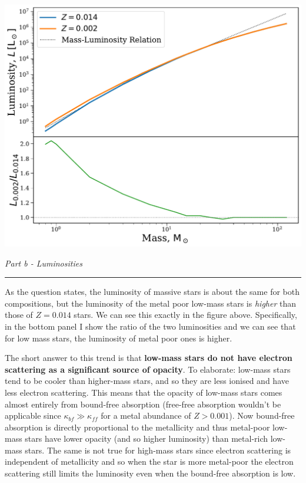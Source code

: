 \documentclass[12pt, letterpaper, twoside]{article}
\newcommand{\question}[1]{{\noindent \it #1}}
\newcommand{\answer}[1]{
    \par\noindent\rule{\textwidth}{0.4pt}#1\vspace{0.5cm}
}
\begin{document}
\begin{center}
    \includegraphics[width=\textwidth]{figures/ml_relation.pdf}
\end{center}   

\question{Part b - Luminosities}
\answer{
    As the question states, the luminosity of massive stars is about the same for both compositions, but the luminosity of the metal poor low-mass stars is \textit{higher} than those of $Z = 0.014$ stars. We can see this exactly in the figure above. Specifically, in the bottom panel I show the ratio of the two luminosities and we can see that for low mass stars, the luminosity of metal poor ones is higher.

    The short answer to this trend is that \textbf{low-mass stars do not have electron scattering as a significant source of opacity}. To elaborate: low-mass stars tend to be cooler than higher-mass stars, and so they are less ionised and have less electron scattering. This means that the opacity of low-mass stars comes almost entirely from bound-free absorption (free-free absorption wouldn't be applicable since $\kappa_{bf} \gg \kappa_{ff}$ for a metal abundance of $Z > 0.001$). Now bound-free absorption is directly proportional to the metallicity and thus metal-poor low-mass stars have lower opacity (and so higher luminosity) than metal-rich low-mass stars. The same is not true for high-mass stars since electron scattering is independent of metallicity and so when the star is more metal-poor the electron scattering still limits the luminosity even when the bound-free absorption is low. 
}
\end{document}
